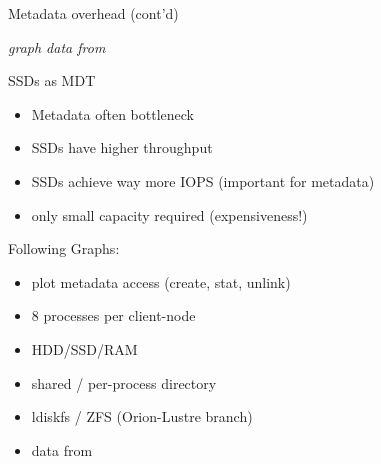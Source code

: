 \begin{frame}{Metadata overhead (cont'd)}
{
    }

    \vspace{1cm}
    \hfill{\scriptsize\emph{graph data from \cite{metadata-scaling}}}
\end{frame}


\begin{frame}{SSDs as MDT}
    \begin{itemize}
        \item Metadata often bottleneck
        \item SSDs have higher throughput
        \item SSDs achieve way more IOPS (important for metadata)
        \item only small capacity required (expensiveness!)
    \end{itemize}

    \pause
    Following Graphs:
    \begin{itemize}
        \item plot metadata access (create, stat, unlink)
        \item 8 processes per client-node
        \item HDD/SSD/RAM
        \item shared / per-process directory
        \item ldiskfs / ZFS (Orion-Lustre branch)
        \item data from \cite{mds-eval}
    \end{itemize}
\end{frame}

